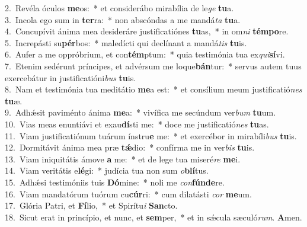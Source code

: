{2.~}Revéla óculos \textbf{me}os:~* et considerábo mirabília de le\textit{ge} \textbf{tu}a.\\
{3.~}Incola ego sum in \textbf{ter}ra:~* non abscóndas a me mandá\textit{ta} \textbf{tu}a.\\
{4.~}Concupívit ánima mea desideráre justificatiónes \textbf{tu}as,~* in om\textit{ni} \textbf{tém}\textbf{po}re.\\
{5.~}Increpásti su\textbf{pér}bos:~* maledícti qui declínant a mandá\textit{tis} \textbf{tu}is.\\
{6.~}Aufer a me oppróbrium, et con\textbf{tém}ptum:~* quia testimónia tua ex\textit{qui}\textbf{sí}vi.\\
{7.~}Etenim sedérunt príncipes, et advérsum me loque\textbf{bán}tur:~* servus autem tuus exercebátur in justificatióni\textit{bus} \textbf{tu}is.\\
{8.~}Nam et testimónia tua meditátio \textbf{me}a est:~* et consílium meum justificatió\textit{nes} \textbf{tu}æ.\\
{9.~}Adhǽsit paviménto ánima \textbf{me}a:~* vivífica me secúndum ver\textit{bum} \textbf{tu}um.\\
{10.~}Vias meas enuntiávi et exau\textbf{dí}sti me:~* doce me justificatió\textit{nes} \textbf{tu}as.\\
{11.~}Viam justificatiónum tuárum ínstru\textbf{e} me:~* et exercébor in mirabíli\textit{bus} \textbf{tu}is.\\
{12.~}Dormitávit ánima mea præ \textbf{tǽ}dio:~* confírma me in ver\textit{bis} \textbf{tu}is.\\
{13.~}Viam iniquitátis ámove \textbf{a} me:~* et de lege tua miseré\textit{re} \textbf{me}i.\\
{14.~}Viam veritátis e\textbf{lé}gi:~* judícia tua non sum \textit{o}\textbf{blí}tus.\\
{15.~}Adhǽsi testimóniis tuis \textbf{Dó}mine:~* noli me \textit{con}\textbf{fún}\textbf{de}re.\\
{16.~}Viam mandatórum tuórum cu\textbf{cúr}ri:~* cum dilatásti \textit{cor} \textbf{me}um.\\
{17.~}Glória Patri, et \textbf{Fí}lio,~* et Spirítu\textit{i} \textbf{San}cto.\\
{18.~}Sicut erat in princípio, et nunc, et \textbf{sem}per,~* et in sǽcula sæculó\textit{rum}. \textbf{A}men.\\
